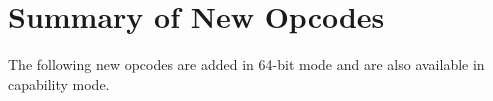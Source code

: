 
























\clearpage
\section{Summary of New Opcodes}

The following new opcodes are added in 64-bit mode and are also
available in capability mode.

